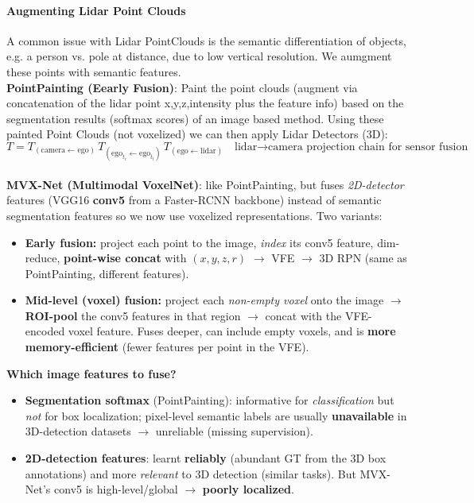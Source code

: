 \documentclass{article}
\begin{document}
\paragraph{Augmenting Lidar Point Clouds}
A common issue with Lidar PointClouds is the semantic differentiation of objects, e.g. a person vs. pole at distance, due to low vertical resolution. We aumgment these points with semantic features.\\

\textbf{PointPainting (Eearly Fusion)}: Paint the point clouds (augment via concatenation of the lidar point x,y,z,intensity plus the feature info) based on the segmentation results (softmax scores) of an image based method. Using these painted Point Clouds (not voxelized) we can then apply Lidar Detectors (3D): $$ T = T_{(\text{camera} \leftarrow \text{ego})} \, T_{(\text{ego}_{t_c} \leftarrow \text{ego}_{t_l})} \, T_{(\text{ego} \leftarrow \text{lidar})}\quad \text{lidar→camera projection chain for sensor fusion} $$\\

\textbf{MVX-Net (Multimodal VoxelNet)}: like PointPainting, but fuses \textit{2D-detector} features (VGG16 \textbf{conv5} from a Faster-RCNN backbone) instead of semantic segmentation features so we now use voxelized representations. Two variants:
\begin{itemize}
    \item \textbf{Early fusion:} project each point to the image, \textit{index} its conv5 feature, dim-reduce, \textbf{point-wise concat} with $(x,y,z,r)$ $\rightarrow$ VFE $\rightarrow$ 3D RPN (same as PointPainting, different features).
    \item \textbf{Mid-level (voxel) fusion:} project each \textit{non-empty voxel} onto the image $\rightarrow$ \textbf{ROI-pool} the conv5 features in that region $\rightarrow$ concat with the VFE-encoded voxel feature. Fuses deeper, can include empty voxels, and is \textbf{more memory-efficient} (fewer features per point in the VFE).
\end{itemize}

\textbf{Which image features to fuse?}
\begin{itemize}
    \item \textbf{Segmentation softmax} (PointPainting): informative for \textit{classification} but \textit{not} for box localization; pixel-level semantic labels are usually \textbf{unavailable} in 3D-detection datasets $\rightarrow$ unreliable (missing supervision).
    \item \textbf{2D-detection features}: learnt \textbf{reliably} (abundant GT from the 3D box annotations) and more \textit{relevant} to 3D detection (similar tasks). But MVX-Net's conv5 is high-level/global $\rightarrow$ \textbf{poorly localized}.
\end{itemize}
\end{document}
